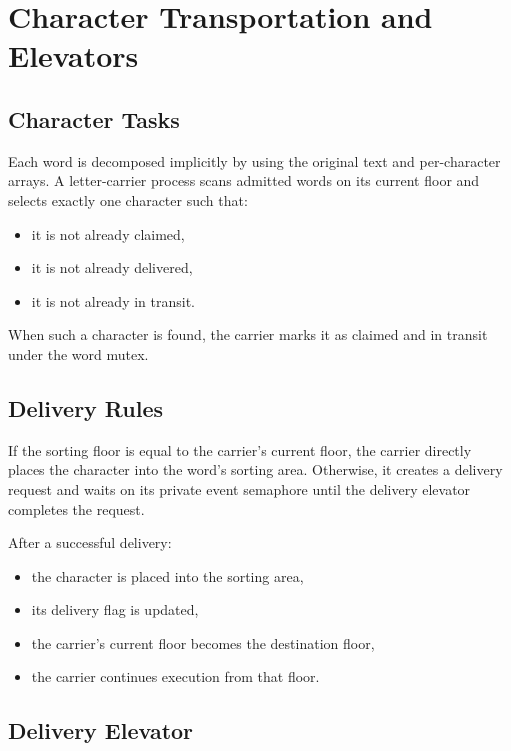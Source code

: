 \documentclass[12pt,a4paper]{article}
\begin{document}
\section{Character Transportation and Elevators}

\subsection{Character Tasks}

Each word is decomposed implicitly by using the original text and per-character arrays. A letter-carrier process scans admitted words on its current floor and selects exactly one character such that:

\begin{itemize}[leftmargin=1.5em]
\item it is not already claimed,
\item it is not already delivered,
\item it is not already in transit.
\end{itemize}

When such a character is found, the carrier marks it as claimed and in transit under the word mutex.

\subsection{Delivery Rules}

If the sorting floor is equal to the carrier's current floor, the carrier directly places the character into the word's sorting area. Otherwise, it creates a delivery request and waits on its private event semaphore until the delivery elevator completes the request.

After a successful delivery:

\begin{itemize}[leftmargin=1.5em]
\item the character is placed into the sorting area,
\item its delivery flag is updated,
\item the carrier's current floor becomes the destination floor,
\item the carrier continues execution from that floor.
\end{itemize}

\subsection{Delivery Elevator}
\end{document}

